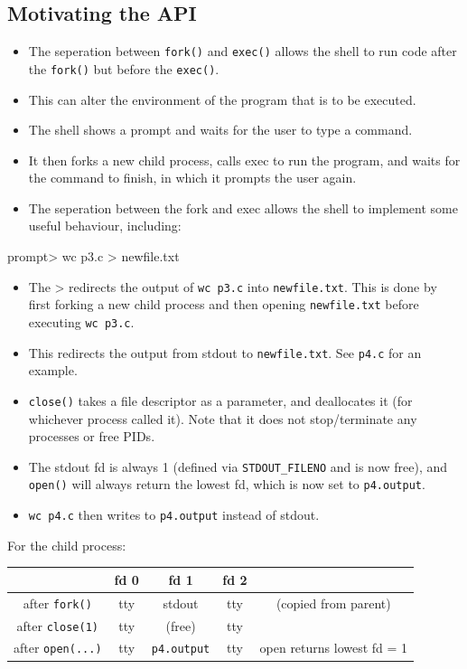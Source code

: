\documentclass[11pt, a4paper]{article}
\theoremstyle{definition}
\theoremstyle{remark}
\begin{document}
\subsection{Motivating the API}
\begin{itemize}
  \item The seperation between \texttt{fork()} and \texttt{exec()} allows the shell to run code after the \texttt{fork()} but before the \texttt{exec()}.
  \item This can alter the environment of the program that is to be executed.
  \item The shell shows a prompt and waits for the user to type a command.
  \item It then forks a new child process, calls exec to run the program, and waits for the command to finish, in which it prompts the user again.
  \item The seperation between the fork and exec allows the shell to implement some useful behaviour, including:
\end{itemize}
\begin{bashcode}
prompt> wc p3.c > newfile.txt
\end{bashcode}
\begin{itemize}
  \item The > redirects the output of \texttt{wc p3.c} into \texttt{newfile.txt}. This is done by first forking a new child process and then opening \texttt{newfile.txt} before executing \texttt{wc p3.c}.
  \item This redirects the output from stdout to \texttt{newfile.txt}. See \texttt{p4.c} for an example.
  \item \texttt{close()} takes a file descriptor as a parameter, and deallocates it (for whichever process called it). Note that it does not stop/terminate any processes or free PIDs.
  \item The stdout fd is always 1 (defined via \texttt{STDOUT\_FILENO} and is now free), and \texttt{open()} will always return the lowest fd, which is now set to \texttt{p4.output}.
  \item \texttt{wc p4.c} then writes to \texttt{p4.output} instead of stdout.
\end{itemize}
\begin{center}
For the child process:
\begin{tabular}{c c c c c}
\hline
& fd 0 & fd 1 & fd 2\\
\hline
after \texttt{fork()} & tty & stdout & tty & (copied from parent) \\
after \texttt{close(1)} & tty & (free) & tty & \\
after \texttt{open(...)} & tty & \texttt{p4.output} & tty & open returns lowest fd = 1 \\
\hline
\end{tabular}
\end{center}
\end{document}

